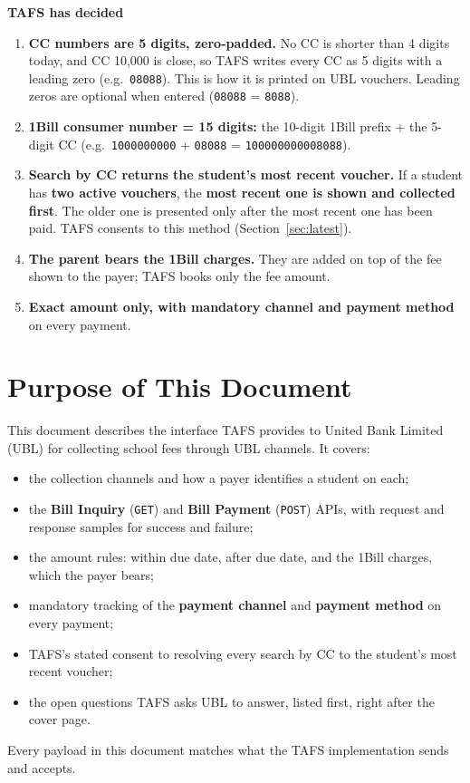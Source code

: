 \documentclass[11pt]{article}
\begin{document}
\bigskip
\noindent\colorbox{decbg}{\parbox{\dimexpr\textwidth-2\fboxsep}{%
\textbf{\large TAFS has decided}
\begin{enumerate}[leftmargin=2.2em, itemsep=2pt, topsep=4pt]
  \item \textbf{CC numbers are 5 digits, zero-padded.} No CC is shorter than 4 digits today, and CC 10,000 is close, so TAFS
        writes every CC as 5 digits with a leading zero (e.g.\ \texttt{08088}). This is how it is printed on UBL vouchers.
        Leading zeros are optional when entered (\texttt{08088} = \texttt{8088}).
  \item \textbf{1Bill consumer number = 15 digits:} the 10-digit 1Bill prefix + the 5-digit CC
        (e.g.\ \texttt{1000000000} + \texttt{08088} = \texttt{100000000008088}).
  \item \textbf{Search by CC returns the student's most recent voucher.} If a student has \textbf{two active vouchers},
        the \textbf{most recent one is shown and collected first}. The older one is presented only after the most recent
        one has been paid. TAFS consents to this method (Section~\ref{sec:latest}).
  \item \textbf{The parent bears the 1Bill charges.} They are added on top of the fee shown to the payer; TAFS books
        only the fee amount.
  \item \textbf{Exact amount only, with mandatory channel and payment method} on every payment.
\end{enumerate}}}

\newpage

\section*{Purpose of This Document}
This document describes the interface TAFS provides to United Bank Limited (UBL) for
collecting school fees through UBL channels. It covers:
\begin{itemize}[nosep]
  \item the collection channels and how a payer identifies a student on each;
  \item the \textbf{Bill Inquiry} (\texttt{GET}) and \textbf{Bill Payment} (\texttt{POST}) APIs, with request
        and response samples for success and failure;
  \item the amount rules: within due date, after due date, and the 1Bill charges, which the payer bears;
  \item mandatory tracking of the \textbf{payment channel} and \textbf{payment method} on every payment;
  \item TAFS's stated consent to resolving every search by CC to the student's most recent voucher;
  \item the open questions TAFS asks UBL to answer, listed first, right after the cover page.
\end{itemize}
Every payload in this document matches what the TAFS implementation sends and accepts.
\end{document}
